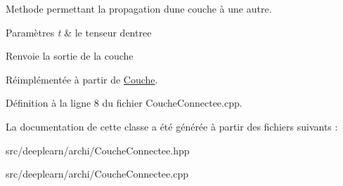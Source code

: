 Methode permettant la propagation d\textquotesingle{}une couche à une autre. 


\begin{DoxyParams}{Paramètres}
{\em t} & le tenseur d\textquotesingle{}entree \\
\hline
\end{DoxyParams}
\begin{DoxyReturn}{Renvoie}
la sortie de la couche 
\end{DoxyReturn}


Réimplémentée à partir de \hyperlink{class_couche_a1f0ed59e21020f5d4f37933af4d1b1e5}{Couche}.



Définition à la ligne 8 du fichier Couche\+Connectee.\+cpp.



La documentation de cette classe a été générée à partir des fichiers suivants \+:\begin{DoxyCompactItemize}
\item 
src/deeplearn/archi/Couche\+Connectee.\+hpp\item 
src/deeplearn/archi/Couche\+Connectee.\+cpp\end{DoxyCompactItemize}
